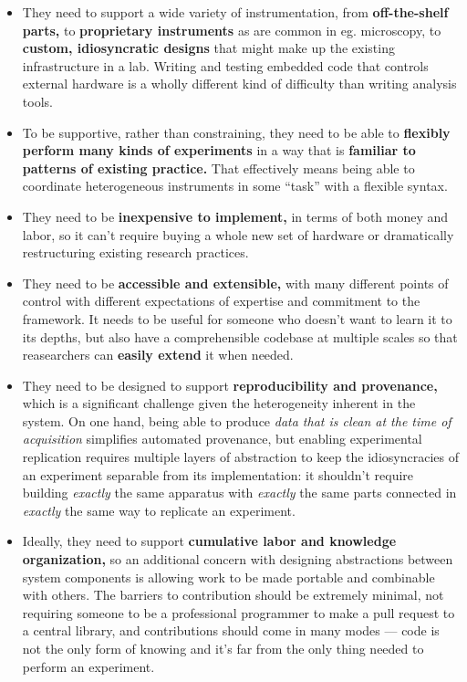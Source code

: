\begin{itemize}
\tightlist
\item
  They need to support a wide variety of instrumentation, from
  \textbf{off-the-shelf parts,} to \textbf{proprietary instruments} as
  are common in eg. microscopy, to \textbf{custom, idiosyncratic
  designs} that might make up the existing infrastructure in a lab.
  Writing and testing embedded code that controls external hardware is a
  wholly different kind of difficulty than writing analysis tools.
\item
  To be supportive, rather than constraining, they need to be able to
  \textbf{flexibly perform many kinds of experiments} in a way that is
  \textbf{familiar to patterns of existing practice.} That effectively
  means being able to coordinate heterogeneous instruments in some
  ``task'' with a flexible syntax.
\item
  They need to be \textbf{inexpensive to implement,} in terms of both
  money and labor, so it can't require buying a whole new set of
  hardware or dramatically restructuring existing research practices.
\item
  They need to be \textbf{accessible and extensible,} with many
  different points of control with different expectations of expertise
  and commitment to the framework. It needs to be useful for someone who
  doesn't want to learn it to its depths, but also have a comprehensible
  codebase at multiple scales so that reasearchers can \textbf{easily
  extend} it when needed.
\item
  They need to be designed to support \textbf{reproducibility and
  provenance,} which is a significant challenge given the heterogeneity
  inherent in the system. On one hand, being able to produce \emph{data
  that is clean at the time of acquisition} simplifies automated
  provenance, but enabling experimental replication requires multiple
  layers of abstraction to keep the idiosyncracies of an experiment
  separable from its implementation: it shouldn't require building
  \emph{exactly} the same apparatus with \emph{exactly} the same parts
  connected in \emph{exactly} the same way to replicate an experiment.
\item
  Ideally, they need to support \textbf{cumulative labor and knowledge
  organization,} so an additional concern with designing abstractions
  between system components is allowing work to be made portable and
  combinable with others. The barriers to contribution should be
  extremely minimal, not requiring someone to be a professional
  programmer to make a pull request to a central library, and
  contributions should come in many modes --- code is not the only form
  of knowing and it's far from the only thing needed to perform an
  experiment.
\end{itemize}

